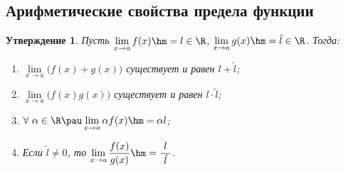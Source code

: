 \documentclass[a4paper,10pt,twoside]{article}
\newtheorem{Ut}{Утверждение}[section]
\begin{document}
\subsection{Арифметические свойства предела функции}
\begin{Ut}
Пусть $\lim\limits_{x\to a}f(x)\hm=l\in\R$, $\lim\limits_{x\to a}g(x)\hm=\tilde l\in\R$. Тогда:

\begin{enumerate}
    \item $\lim\limits_{x\to a}\big(f(x)+g(x)\big)$ существует и равен $l+\tilde l$;

    \item $\lim\limits_{x\to a}\big(f(x)g(x)\big)$ существует и равен $l\cdot\tilde l$;

    \item $\forall\  \alpha\in\R\pau \lim\limits_{x\to a}\alpha f(x)\hm=\alpha l$;

    \item Если $\tilde l\neq 0$, то $\lim\limits_{x\to a}\dfrac{f(x)}{g(x)}\hm=\dfrac{\ l\ }{\tilde l}$.
\end{enumerate}
\end{Ut}
\end{document}
